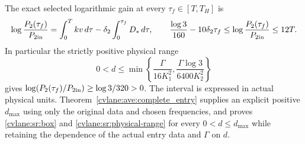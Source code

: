 \begin{cvlanetheorem}
The exact selected logarithmic gain at every
$\tau_f\in[T,T_H]$ is
\begin{equation}\label{cvlane:sr:gain}
 \log\frac{P_2(\tau_f)}{P_{2\rm in}}
 =\int_0^{T}kv\,d\tau-\delta_2\int_0^{\tau_f}D_*\,d\tau,
 \qquad
 \frac{\log3}{160}-10\delta_2\tau_f
 \leq\log\frac{P_2(\tau_f)}{P_{2\rm in}}
 \leq12T.
\end{equation}
In particular the strictly positive physical range
\begin{equation}\label{cvlane:sr:physical-range}
 0<d\leq
 \min\left\{\frac{\Gamma}{16K_1^2},
 \frac{\Gamma\log3}{6400K_2^2}\right\}
\end{equation}
gives $\log(P_2(\tau_f)/P_{2\rm in})\geq\log3/320>0$.
The interval is expressed in actual physical units.
Theorem~\ref{cvlane:ave:complete_entry} supplies an explicit positive
$d_{\max}$ using only the original data and chosen frequencies, and
proves \eqref{cvlane:sr:box} and \eqref{cvlane:sr:physical-range} for every
$0<d\leq d_{\max}$ while retaining the dependence of the actual
entry data and $\Gamma$ on $d$.
\end{cvlanetheorem}

